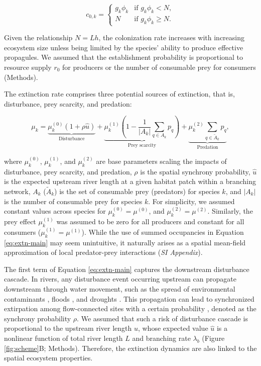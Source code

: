 \documentclass[11pt, class=article, crop=false]{standalone}
\begin{document}
\begin{equation}
    c_{0, k} = 
    \begin{cases}
        g_k \phi_k & \text{if $g_k \phi_k < N$},\\
        N & \text{if $g_k \phi_k \ge N$}.
    \end{cases}
    \label{eq:c0-prod}
\end{equation}

Given the relationship $N = Lh$, the colonization rate increases with increasing ecosystem size unless being limited by the species' ability to produce effective propagules.
We assumed that the establishment probability is proportional to resource supply $r_0$ for producers or the number of consumable prey for consumers (Methods).

The extinction rate comprises three potential sources of extinction, that is, disturbance, prey scarcity, and predation:

\begin{equation}
    \mu_{k} = 
        \underbrace{\mu_{k}^{(0)} (1 + \rho \hat{u})}_{\text{Disturbance}} + 
        \underbrace{\mu_{k}^{(1)} \left(1 - \frac{1}{|A_{k}|}\sum_{q\in A_{k}} p_{q} \right)}_{\text{Prey scarcity}} + 
        \underbrace{\mu_{k}^{(2)} \sum_{q \in \tilde{A}_{k}} p_{q}}_{\text{Predation}},
    \label{eq:extn-main}    
\end{equation}

where $\mu_k^{(0)}$, $\mu_k^{(1)}$, and $\mu_k^{(2)}$ are base parameters scaling the impacts of disturbance, prey scarcity, and predation, $\rho$ is the spatial synchrony probability, $\hat{u}$ is the expected upstream river length at a given habitat patch within a branching network, $A_{k}$ ($\tilde{A}_{k}$) is the set of consumable prey (predators) for species $k$, and $|A_{k}|$ is the number of consumable prey for species $k$.
For simplicity, we assumed constant values across species for $\mu_k^{(0)} = \mu^{(0)}$, and $\mu_k^{(2)} = \mu^{(2)}$.
Similarly, the prey effect $\mu_k^{(1)}$ was assumed to be zero for all producers and constant for all consumers ($\mu_k^{(1)} = \mu^{(1)}$).
While the use of summed occupancies in Equation \ref{eq:extn-main} may seem unintuitive, it naturally arises as a spatial mean-field approximation of local predator-prey interactions (\textit{SI Appendix}).

The first term of Equation \ref{eq:extn-main} captures the downstream disturbance cascade.
In rivers, any disturbance event occurring upstream can propagate downstream through water movement, such as the spread of environmental contaminants \citep{massoudieh_biogeochemical_2010}, floods \citep{swanson_flood_1998, nakamura_disturbance_2000}, and droughts \citep{sarremejane_drought_2021}.
This propagation can lead to synchronized extirpation among flow-connected sites with a certain probability \citep{larsen_geography_2021, sarremejane_drought_2021}, denoted as the synchrony probability $\rho$. 
We assumed that such a risk of disturbance cascade is proportional to the upstream river length $u$, whose expected value $\hat{u}$ is a nonlinear function of total river length $L$ and branching rate $\lambda_b$ (Figure \ref{fig:scheme}B; Methods).
Therefore, the extinction dynamics are also linked to the spatial ecosystem properties.
\end{document}
